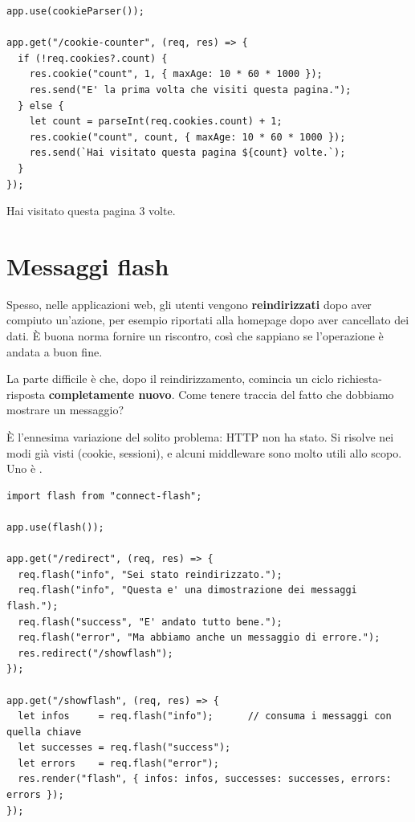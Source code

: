 \begin{affianco}[0.6][c]
\codicepiccolo
\begin{lstlisting}[style=js, name=cookies.js]
app.use(cookieParser());

app.get("/cookie-counter", (req, res) => {
  if (!req.cookies?.count) {
    res.cookie("count", 1, { maxAge: 10 * 60 * 1000 });
    res.send("E' la prima volta che visiti questa pagina.");
  } else {
    let count = parseInt(req.cookies.count) + 1;
    res.cookie("count", count, { maxAge: 10 * 60 * 1000 });
    res.send(`Hai visitato questa pagina ${count} volte.`);
  }
});
\end{lstlisting}
\risultato
\begin{browser}
  Hai visitato questa pagina 3 volte.
\end{browser}
\begin{immagine}
\end{immagine}
\end{affianco}

\section{Messaggi flash}

Spesso, nelle applicazioni web, gli utenti vengono \textbf{reindirizzati} dopo
aver compiuto un'azione, per esempio riportati alla homepage dopo aver
cancellato dei dati. È buona norma fornire un riscontro, così che sappiano se
l'operazione è andata a buon fine.

La parte difficile è che, dopo il reindirizzamento, comincia un ciclo
richiesta-risposta \textbf{completamente nuovo}. Come tenere traccia del fatto
che dobbiamo mostrare un messaggio?

È l'ennesima variazione del solito problema: HTTP non ha stato. Si risolve nei
modi già visti (cookie, sessioni), e alcuni middleware sono molto utili allo
scopo. Uno è .

\begin{lstlisting}[style=js, name=flash.js]
import flash from "connect-flash";

app.use(flash());

app.get("/redirect", (req, res) => {
  req.flash("info", "Sei stato reindirizzato.");
  req.flash("info", "Questa e' una dimostrazione dei messaggi flash.");
  req.flash("success", "E' andato tutto bene.");
  req.flash("error", "Ma abbiamo anche un messaggio di errore.");
  res.redirect("/showflash");
});

app.get("/showflash", (req, res) => {
  let infos     = req.flash("info");      // consuma i messaggi con quella chiave
  let successes = req.flash("success");
  let errors    = req.flash("error");
  res.render("flash", { infos: infos, successes: successes, errors: errors });
});
\end{lstlisting}

